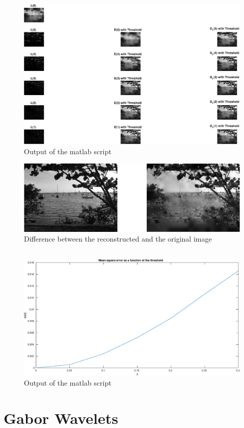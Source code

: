 \documentclass[DIN, pagenumber=false, fontsize=11pt, parskip=half]{scrartcl}
\begin{document}
    \subsection{}
    
    \begin{figure}[H]
        \centering
        \includegraphics[width=\textwidth]{sh05ex02_3_1.eps}
        \caption{Output of the matlab script}
    \end{figure}
    \begin{figure}[H]
        \centering
        \includegraphics[width=\textwidth]{sh05ex02_3_2.eps}
        \caption{Difference between the reconstructed and the original image}
    \end{figure}

    \subsection{}
    
    \begin{figure}[H]
        \centering
        \includegraphics[width=\textwidth]{sh05ex02_4.eps}
        \caption{Output of the matlab script}
    \end{figure}

    \section{Gabor Wavelets}
    
\end{document}
